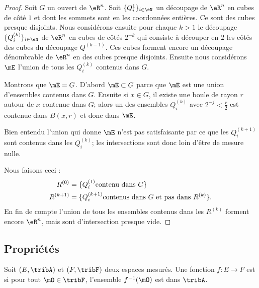 \begin{proof}
    Soit \( G\) un ouvert de \( \eR^n\). Soit \( \{ Q_i^{1} \}_{i\in \eN}\) un découpage de \( \eR^n\) en cubes de côté \( 1\) et dont les sommets sont en les coordonnées entières. Ce sont des cubes presque disjoints. Nous considérons ensuite pour chaque \( k>1\) le découpage \( \{ Q_i^{(k)} \}_{i\in\eN}\) de \( \eR^n\) en cubes de côtés \( 2^{-k}\) qui consiste à découper en \( 2\) les côtés des cubes du découpage \( Q^{(k-1)}\). Ces cubes forment encore un découpage dénombrable de \( \eR^n\) en des cubes presque disjoints. Ensuite nous considérons \( \mE\) l'union de tous les \( Q_i^{(k)}\) contenus dans \( G\).

    Montrons que \( \mE=G\). D'abord \( \mE\subset G\) parce que \( \mE\) est une union d'ensembles contenus dans \( G\). Ensuite si \( x\in G\), il existe une boule de rayon \( r\) autour de \( x\) contenue dans \( G\); alors un des ensembles \( Q_i^{(k)}\) avec \( 2^{-j}<\frac{ r }{2}\) est contenue dans \( B(x,r)\) et donc dans \( \mE\).

    Bien entendu l'union qui donne \( \mE\) n'est pas satisfaisante par ce que les \( Q_i^{(k+1)}\) sont contenus dans les \( Q_i^{(k)}\); les intersections sont donc loin d'être de mesure nulle.

    Nous faisons ceci : 
    \begin{subequations}
        \begin{align}
            R^{(0)}&=\{ Q_i^{(1)} \text{contenu dans \( G\)} \}\\
            R^{(k+1)}&=\{ Q_i^{(k+1)}\text{contenus dans \( G\) et pas dans \( R^{(k)}\)} \}.
        \end{align}
    \end{subequations}
    En fin de compte l'union de tous les ensembles contenus dans les \( R^{(k)}\) forment encore \( \eR^n\), mais sont d'intersection presque vide.
\end{proof}

\subsection{Propriétés}

\begin{definition} \label{DefQKjDSeC}
    Soit \( (E,\tribA)\) et \( (F,\tribF)\) deux espaces mesurés. Une fonction \( f\colon E\to F\) est  si pour tout \( \mO\in \tribF\), l'ensemble \( f^{-1}(\mO)\) est dans \( \tribA\).
\end{definition}

